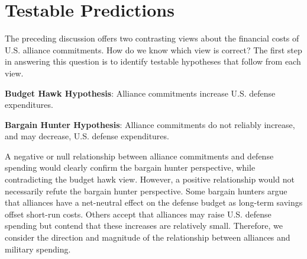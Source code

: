 \begin{comment}
The capabilities that Washington needs may rise along with the number of countries under its defense umbrella. Some have argued, for example, that the United States needs a larger nuclear arsenal in order to credibly protect its allies.\autocite[See the discussion in Chapter 2 of][]{actonlow11} However, based on this perspective, at least some spending that seems to protect allies in fact satisfies other U.S. national security objectives. 

\end{comment}

\section*{Testable Predictions}


The preceding discussion offers two contrasting views about the financial costs of U.S. alliance commitments. How do we know which view is correct? The first step in answering this question is to identify testable hypotheses that follow from each view. 

\singlespacing

\noindent \textbf{Budget Hawk Hypothesis}: Alliance commitments increase U.S. defense expenditures.

\vspace{1em}

\noindent \textbf{Bargain Hunter Hypothesis}: Alliance commitments do not reliably increase, and may decrease, U.S. defense expenditures.

\doublespacing

A negative or null relationship between alliance commitments and defense spending would clearly confirm the bargain hunter perspective, while contradicting the budget hawk view. However, a positive relationship would not necessarily refute the bargain hunter perspective. Some bargain hunters argue that alliances have a net-neutral effect on the defense budget as long-term savings offset short-run costs.\autocite[See, for example,][]{rapphoopershields20,colbyTNI16} Others accept that alliances may raise U.S. defense spending but contend that these increases are relatively small. Therefore, we consider the direction and magnitude of the relationship between alliances and military spending. 

